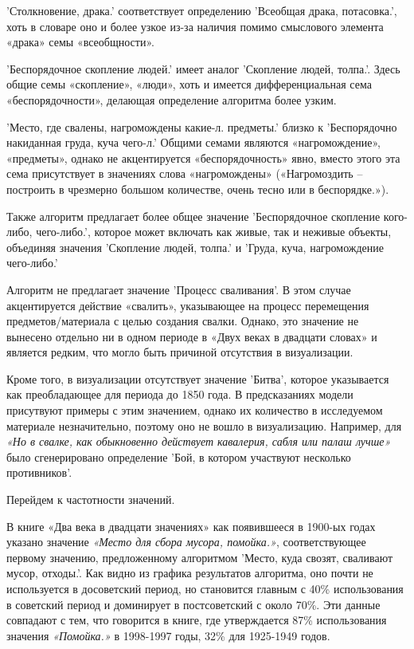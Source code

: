 \documentclass[LI,VKR]{HSEUniversity}
\begin{document}
’Столкновение, драка.’ соответствует определению
’Всеобщая драка, потасовка.’,
хоть в словаре оно и более узкое из-за наличия помимо смыслового элемента
«драка» семы «всеобщности».

’Беспорядочное скопление людей.’ имеет аналог
’Скопление людей, толпа.’.
Здесь общие семы «скопление», «люди», хоть и имеется дифференциальная сема «беспорядочности»,
делающая определение алгоритма более узким.

’Место, где свалены, нагромождены какие-л. предметы.’ близко к
’Беспорядочно накиданная груда, куча чего-л.’
Общими семами являются
«нагромождение», «предметы», однако не акцентируется
«беспорядочность» явно, вместо этого эта сема присутствует в значениях слова
«нагромождены» («Нагромоздить –
построить в чрезмерно большом количестве, очень тесно или в беспорядке.»).

Также алгоритм предлагает более общее значение
’Беспорядочное скопление кого-либо, чего-либо.’,
которое может включать как живые, так и неживые объекты, объединяя
значения ’Скопление людей, толпа.’ и ’Груда, куча, нагромождение чего-либо.’

Алгоритм не предлагает значение ’Процесс сваливания’.
В этом случае акцентируется действие «свалить», указывающее на процесс перемещения
предметов/материала с целью создания свалки.
Однако, это значение не вынесено отдельно ни в одном периоде в «Двух веках в двадцати словах»
и является редким, что могло быть причиной отсутствия в визуализации.

Кроме того, в визуализации отсутствует значение ’Битва’,
которое указывается как преобладающее для периода до 1850 года.
В предсказаниях модели присутвуют примеры с этим значением,
однако их количество в исследуемом материале незначительно,
поэтому оно не вошло в визуализацию.
Например, для \textit{«Но в свалке, как обыкновенно действует кавалерия, сабля или палаш лучше»}
было сгенерировано определение
’Бой, в котором участвуют несколько противников’.


Перейдем к частотности значений.

В книге «Два века в двадцати значениях» как появившееся в 1900-ых годах указано
значение \textit{«Место для сбора мусора, помойка.»}, соответствующее первому значению,
предложенному алгоритмом ’Место, куда свозят, сваливают мусор, отходы.’.
Как видно из графика результатов алгоритма, оно почти не используется в досоветский период,
но становится главным
с 40\% использования в советский период и доминирует в постсоветский с около 70\%.
Эти данные совпадают с тем, что говорится в книге, где утверждается 87\% использования
значения \textit{«Помойка.»} в 1998-1997 годы, 32\% для 1925-1949 годов.
\end{document}
